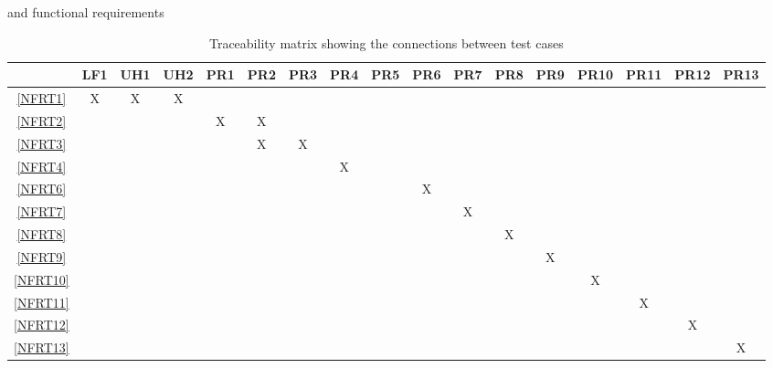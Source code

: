 \documentclass[12pt, titlepage]{article}
\begin{document}
\begin{landscape}
\begin{table}[h!]
{      and functional requirements}
    \label{tab:frt}
  \end{table}
  \begin{table}[h!]
    \centering
    \begin{tabular}{|c|c|c|c|c|c|c|c|c|c|c|c|c|c|c|c|c|} \hline
                & LF1 & UH1 & UH2 & PR1 & PR2 & PR3 & PR4 & PR5 & PR6 & PR7 & PR8 & PR9 & PR10 & PR11 & PR12 & PR13 \\ \hline
      \ref{NFRT1}  & X   & X   & X   &     &     &     &     &     &     &     &     &     &      &      &      &      \\ \hline
      \ref{NFRT2}  &     &     &     & X   & X   &     &     &     &     &     &     &     &      &      &      &      \\ \hline
      \ref{NFRT3}  &     &     &     &     & X   & X   &     &     &     &     &     &     &      &      &      &      \\ \hline
      \ref{NFRT4}  &     &     &     &     &     &     & X   &     &     &     &     &     &      &      &      &      \\ \hline
      \ref{NFRT6}  &     &     &     &     &     &     &     &     & X   &     &     &     &      &      &      &      \\ \hline
      \ref{NFRT7}  &     &     &     &     &     &     &     &     &     & X   &     &     &      &      &      &      \\ \hline
      \ref{NFRT8}  &     &     &     &     &     &     &     &     &     &     & X   &     &      &      &      &      \\ \hline
      \ref{NFRT9}  &     &     &     &     &     &     &     &     &     &     &     & X   &      &      &      &      \\ \hline
      \ref{NFRT10} &     &     &     &     &     &     &     &     &     &     &     &     & X    &      &      &      \\ \hline
      \ref{NFRT11} &     &     &     &     &     &     &     &     &     &     &     &     &      & X    &      &      \\ \hline
      \ref{NFRT12} &     &     &     &     &     &     &     &     &     &     &     &     &      &      & X    &      \\ \hline
      \ref{NFRT13} &     &     &     &     &     &     &     &     &     &     &     &     &      &      &      & X    \\ \hline
    \end{tabular}
    \caption{Traceability matrix showing the connections between test cases
}
\end{table}
\end{landscape}
\end{document}

